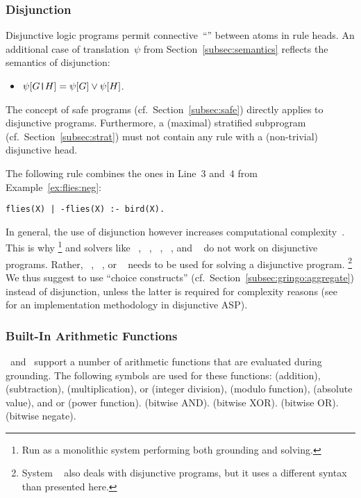 \subsubsection{Disjunction}\label{subsec:gringo:disjunction}

Disjunctive logic programs permit connective~``\code{|}'' between atoms in rule heads.
An additional case of translation~$\psi$ from Section~\ref{subsec:semantics}
reflects the semantics of disjunction:
\begin{itemize}
\item $\psi[G\texttt{|}H]=\psi[G]\vee\psi[H]$.
\end{itemize}
%
The concept of safe programs (cf.\ Section~\ref{subsec:safe}) directly applies
to disjunctive programs.
Furthermore, a (maximal) stratified subprogram (cf.\ Section~\ref{subsec:strat})
must not contain any rule with a (non-trivial) disjunctive head.

The following rule combines the ones in Line~3 and~4 from Example~\ref{ex:flies:neg}:
\begin{lstlisting}[numbers=none]
flies(X) | -flies(X) :- bird(X).
\end{lstlisting}
In general, the use of disjunction however increases
computational complexity~\cite{eitgot95a}.
This is why \clingo%
\footnote{Run as a monolithic system performing both grounding and solving.}
and solvers like 
\assat~\cite{linzha04a},
\clasp~\cite{gekanesc07b},
\nomorepp~\cite{angelinesc05c},
\smodels~\cite{siniso02a}, and
\smodelscc~\cite{warsch04a}
do not work on disjunctive programs.
Rather,
\claspD~\cite{drgegrkakoossc08a},
\cmodels~\cite{gilima06a,lierler05a}, or
\gnt~\cite{janisesiyo06a}
needs to be used for solving a disjunctive program.%
\footnote{System \dlv~\cite{dlv03a} also deals with disjunctive programs,
  but it uses a different syntax than presented here.}
We thus suggest to use ``choice constructs'' (cf.\ Section~\ref{subsec:gringo:aggregate})
instead of disjunction, unless the latter is required for complexity reasons
(see~\cite{eitpol06a} for an implementation methodology in disjunctive ASP).


\subsubsection{Built-In Arithmetic Functions}\label{subsec:gringo:arith}

\gringo\ and \clingo\ support a number of arithmetic functions that
are evaluated during grounding.
The following symbols are used for these functions:
\code{+} (addition),
\code{-} (subtraction),
\code{*} (multiplication),
\code{/} or  (integer division),
 (modulo function),
 (absolute value), and
\code{**} or  (power function).
\code{\&} (bitwise AND).
\code{\^} (bitwise XOR).
 (bitwise OR).
\code{\~} (bitwise negate).

